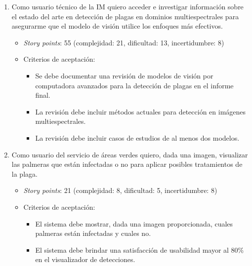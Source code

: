 \documentclass[
11pt, %
]{charter}
\begin{document}
\begin{enumerate}
  \item Como usuario técnico de la IM quiero acceder e investigar información sobre el estado del arte en detección de plagas en dominios multiespectrales para asegurarme que el modelo de visión utilice los enfoques más efectivos.
        \begin{itemize}
          \item \textit{Story points}: 55 (complejidad: 21, dificultad: 13, incertidumbre: 8)
          \item Criterios de aceptación:
                \begin{itemize}
                  \item Se debe documentar una revisión de modelos de visión por computadora avanzados para la detección de plagas en el informe final.
                  \item La revisión debe incluir métodos actuales para detección en imágenes multiespectrales.
                  \item La revisión debe incluir casos de estudios de al menos dos modelos.
                \end{itemize}
        \end{itemize}

  \item Como usuario del servicio de áreas verdes quiero, dada una imagen, visualizar las palmeras que están infectadas o no para aplicar posibles tratamientos de la plaga.
        \begin{itemize}
          \item \textit{Story points}: 21 (complejidad: 8, dificultad: 5, incertidumbre: 8)
          \item Criterios de aceptación:
                \begin{itemize}
                  \item El sistema debe mostrar, dada una imagen proporcionada, cuales palmeras están infectadas y cuales no.
                  \item El sistema debe brindar una satisfacción de usabilidad mayor al 80\% en el visualizador de detecciones.
                \end{itemize}
        \end{itemize}


\end{enumerate}
\end{document}
